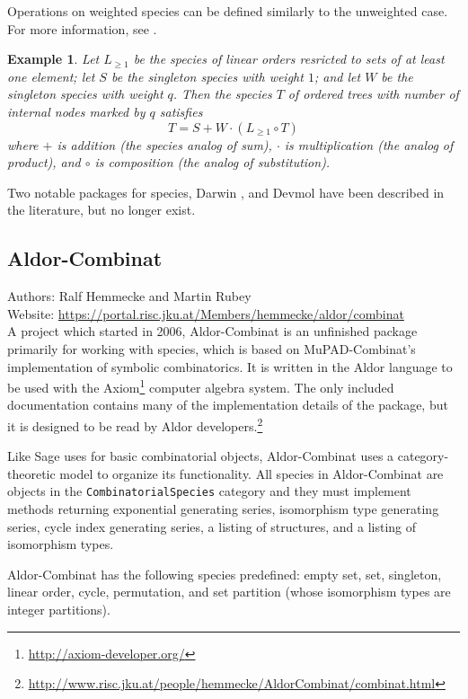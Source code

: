 \documentclass[12pt]{article}
\theoremstyle{plain}
\newtheorem{exa}{Example}
\newcommand{\codefont}[1]{{\fontshape{n}\texttt{#1}}}
\begin{document}
Operations on weighted species can be defined similarly to the unweighted case.
For more information, see \cite{speciesbook}.

\begin{exa}
Let \( L_{ \geq 1} \) be the species of linear orders resricted to sets of at least one element;
let \( S \) be the singleton species with weight \( 1 \); and let \( W \) be the singleton species with weight \( q \).
Then the species \( T \) of ordered trees with number of internal nodes marked by \( q \) satisfies
\[ T=S + W \cdot (L_{\geq 1} \circ T) \]
where \( + \) is addition (the species analog of sum), \( \cdot \) is multiplication (the analog of product), and \( \circ \) is composition (the analog of substitution).\\
\end{exa}

Two notable packages for species, Darwin \cite{darwin1,darwin2}, and Devmol \cite{devmol} have been described in the literature, but no longer exist.

\subsection{Aldor-Combinat}
Authors: Ralf Hemmecke and Martin Rubey
\\
Website: \url{https://portal.risc.jku.at/Members/hemmecke/aldor/combinat}
\\

A project which started in 2006, Aldor-Combinat is an unfinished package primarily for working with species,
which is based on MuPAD-Combinat's implementation of symbolic combinatorics.
It is written in the Aldor language to be used with the Axiom\footnote{
 \url{http://axiom-developer.org/}
} computer algebra system.
The only included documentation contains many of the implementation details of the package, but
it is designed to be read by Aldor developers.\footnote{
 \url{http://www.risc.jku.at/people/hemmecke/AldorCombinat/combinat.html}
}


Like Sage uses for basic combinatorial objects, Aldor-Combinat uses a category-theoretic model to organize its functionality.
All species in Aldor-Combinat are objects in the  \codefont{CombinatorialSpecies} category and they must implement methods returning
exponential generating series,
isomorphism type generating series,
cycle index generating series,
a listing of structures,
and a listing of isomorphism types.

Aldor-Combinat has the following species predefined:
empty set,
set,
singleton,
linear order,
cycle,
permutation, and
set partition (whose isomorphism types are integer partitions).
\end{document}
